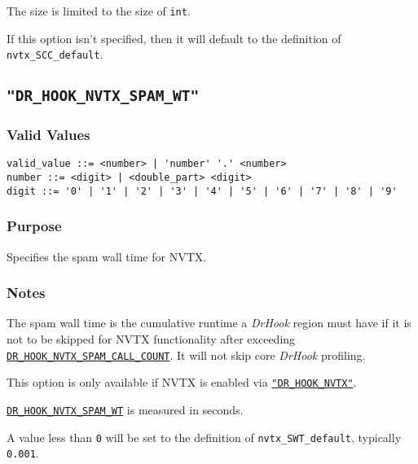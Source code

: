 The size is limited to the size of \verb|int|.

If this option isn't specified, then it will default to the definition of \verb|nvtx_SCC_default|.


\subsection{\texttt{"DR\_HOOK\_NVTX\_SPAM\_WT"}}
\label{section:flags:DR_HOOK_NVTX_SPAM_WT}
\vspace{-2ex}
\subsubsection{Valid Values}
\vspace{-2ex}
\verb+valid_value ::= <number> | 'number' '.' <number>+ \\
\verb+number ::= <digit> | <double_part> <digit>+ \\
\verb+digit ::= '0' | '1' | '2' | '3' | '4' | '5' | '6' | '7' | '8' | '9'+

\vspace{-2ex}
\subsubsection{Purpose}
\vspace{-2ex}
Specifies the spam wall time for NVTX.

\vspace{-2ex}
\subsubsection{Notes}
\vspace{-2ex}
The spam wall time is the cumulative runtime a \textit{DrHook} region must have if it is not to be skipped for NVTX functionality after exceeding \hyperref[section:flags:DR_HOOK_NVTX_SPAM_CALL_COUNT]{\texttt{DR\_HOOK\_NVTX\_SPAM\_CALL\_COUNT}}. It will not skip core \textit{DrHook} profiling.

This option is only available if NVTX is enabled via \hyperref[section:flags:DR_HOOK_NVTX]{\texttt{"DR\_HOOK\_NVTX"}}.

\hyperref[section:flags:DR_HOOK_NVTX_SPAM_WT]{\texttt{DR\_HOOK\_NVTX\_SPAM\_WT}} is measured in seconds.

A value less than \verb|0| will be set to the definition of \verb|nvtx_SWT_default|, typically \verb|0.001|.

